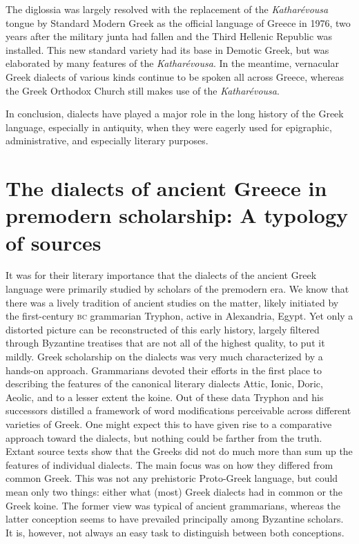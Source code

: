 The diglossia was largely resolved with the replacement of the \textit{Katharévousa} tongue by Standard Modern Greek as the official language of Greece in 1976, two years after the military junta had fallen and the Third Hellenic Republic was installed. This new standard variety had its base in Demotic Greek, but was elaborated by many features of the \textit{Katharévousa}. In the meantime, vernacular Greek dialects of various kinds continue to be spoken all across Greece, whereas the Greek Orthodox Church still makes use of the \textit{Katharévousa}.

In conclusion, dialects have played a major role in the long history of the Greek language, especially in antiquity, when they were eagerly used for epigraphic, administrative, and especially literary purposes.

\section[The dialects of ancient Greece in premodern scholarship]{The dialects of ancient Greece in premodern scholarship: A typology of sources}\label{sec:1.2}

It was for their literary importance that the dialects of the ancient Greek language were primarily studied by scholars of the premodern era. We know that there was a lively tradition of ancient studies on the matter, likely initiated by the first-century \textsc{bc} grammarian Tryphon, active in Alexandria, Egypt. Yet only a distorted picture can be reconstructed of this early history, largely filtered through Byzantine treatises that are not all of the highest quality, to put it mildly. Greek scholarship on the dialects was very much characterized by a hands-on approach. Grammarians devoted their efforts in the first place to describing the features of the canonical literary dialects Attic, Ionic, Doric, Aeolic, and to a lesser extent the koine. Out of these data Tryphon and his successors distilled a framework of word modifications perceivable across different varieties of Greek. One might expect this to have given rise to a comparative approach toward the dialects, but nothing could be farther from the truth. Extant source texts show that the Greeks did not do much more than sum up the features of individual dialects. The main focus was on how they differed from common Greek. This was not any prehistoric Proto-Greek language, but could mean only two things: either what (most) Greek dialects had in common or the Greek koine. The former view was typical of ancient grammarians, whereas the latter conception seems to have prevailed principally among Byzantine scholars. It is, however, not always an easy task to distinguish between both conceptions.

